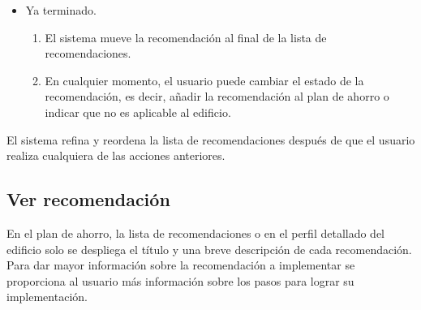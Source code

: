 \begin{usecase}
{\begin{itemize}
\begin{enumerate}
        recomendaciones.
      \item En cualquier momento, el usuario puede cambiar el estado de la
        recomendación, es decir, añadir la recomendación al plan de ahorro
        o indicar que no es aplicable al edificio.
      \end{enumerate}
    \item Ya terminado.
      \begin{enumerate}
      \item El sistema mueve la recomendación al final de la lista de
        recomendaciones.
      \item En cualquier momento, el usuario puede cambiar el estado de la
        recomendación, es decir, añadir la recomendación al plan de ahorro
        o indicar que no es aplicable al edificio.
      \end{enumerate}
    \end{itemize}
  \item El sistema refina y reordena la lista de recomendaciones después de que
    el usuario realiza cualquiera de las acciones anteriores.
  }
\end{usecase}

\subsection{Ver recomendación}

En el plan de ahorro, la lista de recomendaciones o en el perfil detallado
del edificio solo se despliega el título y una breve descripción de cada
recomendación. Para dar mayor información sobre la recomendación a implementar se
proporciona al usuario más información sobre los pasos para lograr su
implementación.

